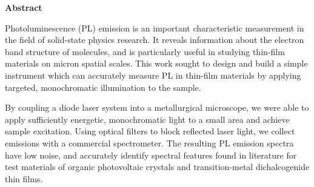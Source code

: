 \thispagestyle{plain}
\begin{center}
 
 
    \textbf{Abstract}
\end{center}

Photoluminescence (PL) emission is an important characteristic measurement in the field of solid-state physics research. It reveals information about the electron band structure of molecules, and is particularly useful in studying thin-film materials on micron spatial scales. This work sought to design and build a simple instrument which can accurately measure PL in thin-film materials by applying targeted, monochromatic illumination to the sample.

By coupling a diode laser system into a metallurgical microscope, we were able to apply sufficiently energetic, monochromatic light to a small area and achieve sample excitation. Using optical filters to block reflected laser light, we collect emissions with a commercial spectrometer. The resulting PL emission spectra have low noise, and accurately identify spectral features found in literature for test materials of organic photovoltaic crystals and transition-metal dichalcogenide thin films.